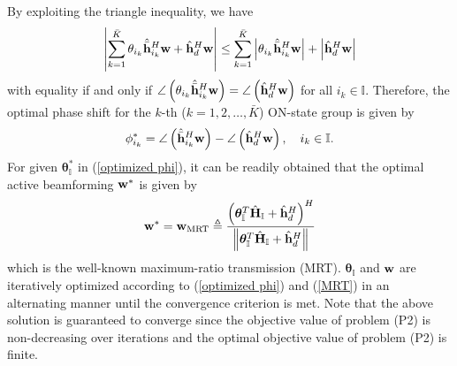 \documentclass[draftclsnofoot,onecolumn,12pt]{IEEEtran}
\begin{document}
By exploiting the triangle inequality, we have
\begin{align}
 \left|\sum_{k=1}^{\bar K}{ \theta}_{i_k}\hat{\bar{{\bf h}}}_{i_k}^H{\bf w} + \hat{\bf h}_d^H {\bf w}\right| \le  \sum_{k=1}^{\bar K}\left| {\theta}_{i_k}\hat{\bar{{\bf h}}}_{i_k}^H{\bf w}\right| + \left|\hat{\bf h}_d^H {\bf w}\right|
\end{align}
with equality if and only if $\angle\left({ \theta}_{i_k}\hat{\bar{{\bf h}}}_{i_k}^H{\bf w}\right)=\angle\left( \hat{\bf h}_d^H {\bf w}\right)$ for all $i_k\in\mathbb{I}$. 
Therefore, the optimal phase shift for the $k$-th ($k=1,2,\ldots,{\bar{K}}$) ON-state group is given by
\begin{align}\label{optimized phi}
\phi_{i_k}^*=\angle\left(\hat{\bar{{\bf h}}}_{i_k}^H{\bf w}\right)-\angle\left( \hat{\bf h}_d^H {\bf w}\right), \quad i_k  \in \mathbb{I}. 
\end{align}
For given ${\bm \theta}_{\mathbb I}^*$ in (\ref{optimized phi}), it can be readily obtained that the optimal active beamforming ${\bf w}^*$ is given by
\begin{align}\label{MRT}
{\bf w}^*={\bf w}_{\text{MRT}} \triangleq \frac{\left({\bm \theta}_{\mathbb I}^T \hat{\bf H}_{\mathbb I} + \hat{\bf h}_d^H\right)^H }{\left\|{\bm \theta}_{\mathbb I}^T \hat{\bf H}_{\mathbb I} + \hat{\bf h}_d^H \right\|}
\end{align}
which is the well-known maximum-ratio transmission (MRT). 
$\bm \theta_{\mathbb I}$ and $\bf w$ are iteratively optimized according to (\ref{optimized phi}) and (\ref{MRT}) in an alternating manner until the convergence criterion is met. 
Note that the above solution is guaranteed to converge since the objective value of problem (P2) is non-decreasing over iterations and  the optimal objective value of problem (P2) is finite. 
\end{document}
